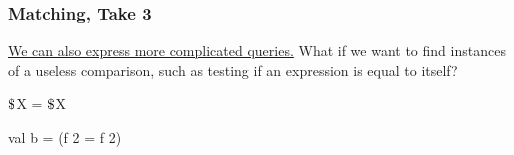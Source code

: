 \documentclass[aspectratio=169, handout]{beamer}
\newcommand{\dollar}{\mbox{\textdollar}}
\begin{document}
\begin{frame}[fragile]
  \frametitle{Matching, Take 3}

  \begin{center}
    \begin{minipage}[t][0.21\textheight][t]{\textwidth}
      \raggedright
      {\color{blue}\href{https://semgrep.dev/playground/s/YxEX}{We can also express more complicated queries.}} What if we want to find instances
      of a useless comparison, such as testing if an expression is equal to itself?
    \end{minipage}
    \begin{minipage}[t][0.515\textheight][t]{\textwidth}
      \begin{minipage}{0.48\textwidth}
        \centering
      \end{minipage}
      \begin{minipage}{0.48\textwidth}
        \centering
      \end{minipage}
    \end{minipage}
    \begin{minipage}[t][0.3\textheight][t]{\textwidth}
      \begin{minipage}{0.48\textwidth}
        \centering
        \begin{codeblock}
          $\dollar$X = $\dollar$X
        \end{codeblock}
      \end{minipage}
      \begin{minipage}{0.48\textwidth}
        \begin{codeblock}
          val b = (f 2 = f 2)
        \end{codeblock}
      \end{minipage}
    \end{minipage}
  \end{center}
\end{frame}
\end{document}
